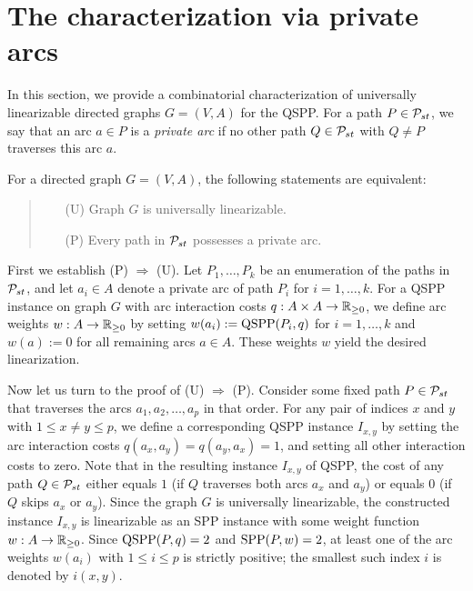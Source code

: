 \documentclass[11pt,fleqn]{article}
\begin{document}
\section{The characterization via private arcs}
\label{sec:private}
In this section, we provide a combinatorial characterization of universally linearizable 
directed graphs $G=(V,A)$ for the QSPP.
For a path $P\in{\cal P}_{st}$, we say that an arc $a\in P$ is a \emph{private arc} if no other 
path $Q\in{\cal P}_{st}$ with $Q\ne P$ traverses this arc $a$.
\begin{theorem}
\label{th:private}
For a directed graph $G=(V,A)$, the following statements are equivalent:
\begin{quote}
\begin{itemize}
\item[(U)] Graph $G$ is universally linearizable.
\item[(P)] Every path in ${\cal P}_{st}$ possesses a private arc.
\end{itemize}
\end{quote}
\end{theorem}
\proof
First we establish (P) $\Rightarrow$ (U).
Let $P_1,\ldots,P_k$ be an enumeration of the paths in ${\cal P}_{st}$, and
let $a_i\in A$ denote a private arc of path $P_i$ for $i=1,\ldots,k$.
For a QSPP instance on graph $G$ with arc interaction costs $q:A\times A\to{\mathbb{R}_{\ge0}}$, we define 
arc weights $w:A\to{\mathbb{R}_{\ge0}}$ by setting $w(a_i):=\text{QSPP}(P_i,q)$ for $i=1,\ldots,k$ and 
$w(a):=0$ for all remaining arcs $a\in A$.
These weights $w$ yield the desired linearization.

Now let us turn to the proof of (U) $\Rightarrow$ (P).
Consider some fixed path $P\in{\cal P}_{st}$ that traverses the arcs $a_1,a_2,\ldots,a_p$ in that order.
For any pair of indices $x$ and $y$ with $1\le x\ne y\le p$, we define a corresponding QSPP instance
$I_{x,y}$ by setting the arc interaction costs $q(a_x,a_y)=q(a_y,a_x)=1$, and setting all other 
interaction costs to zero.
Note that in the resulting instance $I_{x,y}$ of QSPP, the cost of any path $Q\in{\cal P}_{st}$ 
either equals $1$ (if $Q$ traverses both arcs $a_x$ and $a_y$) or equals $0$ (if $Q$ skips 
$a_x$ or $a_y$).
Since the graph $G$ is universally linearizable, the constructed instance $I_{x,y}$ is linearizable
as an SPP instance with some weight function $w:A\to{\mathbb{R}_{\ge0}}$.
Since $\text{QSPP}(P,q)=2$ and $\text{SPP}(P,w)=2$, at least one of the arc weights $w(a_i)$ with 
$1\le i\le p$ is strictly positive; the smallest such index $i$ is denoted by $i(x,y)$.
\end{document}

